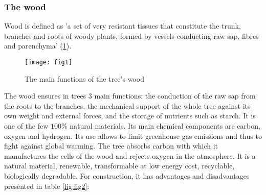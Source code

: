 \subsubsection{The wood}

Wood is defined as 'a set of very resistant tissues that constitute the trunk, branches and roots of woody plants, formed by vessels conducting raw sap, fibres and parenchyma' (\ref{fig:fig1}). 


\begin{figure}[htp]
	\centering
	\texttt{[image: fig1]}
	\caption{The main functions of the tree's wood \cite{B.Thibaut}}
	\label{fig:fig1}
\end{figure}

The wood ensures in trees 3 main functions: the conduction of the raw sap from the roots to the branches, the mechanical support of the whole tree against its own weight and external forces, and the storage of nutrients such as starch. It is one of the few $100 \%$ natural materials. Its main chemical components are carbon, oxygen and hydrogen. Its use allows to limit greenhouse gas emissions and thus to fight against global warming. The tree absorbs carbon with which it manufactures the cells of the wood and rejects oxygen in the atmosphere. It is a natural material, renewable, transformable at low energy cost, recyclable, biologically degradable. For construction, it has advantages and disadvantages presented in table \ref{fig:fig2}:

\begin{comment}
\begin{table} \centering
	\begin{tabular}{cc}
		\toprule %
		 The advantages and disadvantages of wood  \\\midrule
		The advantages & The disavantages \\\midrule
		Solidity and lightness: the strength-to-weight ratio is high. Its low density (500kg/m3) allows the use of less massive foundations.& Natural material and therefore has a high variability \\\midrule  
		Good thermal insulation: it is much less conductive than steel or concrete and reduces thermal bridges in buildings. & Orthotropic material \\\midrule
		Renewable and aesthetic. & Moisture-sensitive material \\\midrule
		Chemically inert. & Material sensitive to attack by insects and fungi \\\midrule
		Good fire behaviour: there is no toxic release, little heat transmission to neighbouring parts. Wood has a higher load-bearing capacity than steel. & Material that requires regular maintenance. \\ 
		\bottomrule %
	\end{tabular}
	\caption{Orders of magnitude of axial compressive strengths and elastic moduli}
	\label{fig:fig13}
\end{table}
\end{comment}

